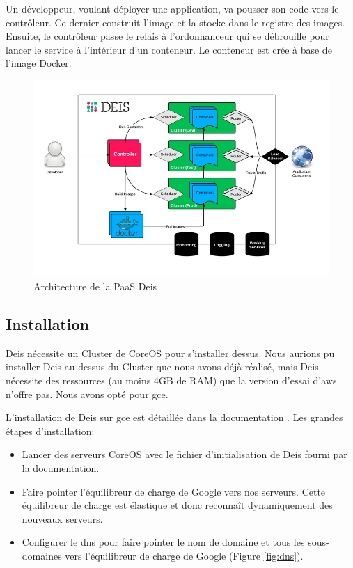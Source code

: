 \begin{onehalfspace}
Un développeur, voulant déployer une application, va pousser son code vers le contrôleur. Ce dernier construit l'image et la stocke dans le registre des images. Ensuite, le contrôleur passe le relais à l'ordonnanceur qui se débrouille pour lancer le service à l'intérieur d'un conteneur. Le conteneur est crée à base de l'image Docker.



\begin{figure}[H]
\centering
\includegraphics [scale=0.6]{chapitre5/assets/deis-architecture}
\caption{Architecture de la PaaS Deis \cite{deis-archi}}
\label{fig:deis-architecture}
\end{figure}


\subsection{Installation}


Deis nécessite un Cluster de CoreOS pour s'installer dessus. Nous aurions pu installer Deis au-dessus du Cluster que nous avons déjà réalisé, mais Deis nécessite des ressources (au moins 4GB de RAM) que la version d'essai d'\acrshort{aws} n'offre pas. Nous avons opté pour \acrshort{gce}.

L'installation de Deis sur \acrshort{gce} est détaillée dans la documentation \cite{deis-gce}. Les grandes étapes d'installation:
\begin{itemize}
	\item Lancer des serveurs CoreOS avec le fichier d'initialisation de Deis fourni par la documentation.
	\item Faire pointer l'équilibreur de charge de Google vers nos serveurs. Cette équilibreur de charge est élastique et donc reconnaît dynamiquement des nouveaux serveurs.
	\item Configurer le \acrshort{dns} pour faire pointer le nom de domaine et tous les sous-domaines vers l'équilibreur de charge de Google (Figure \ref{fig:dns}).
\end{itemize}


\end{onehalfspace}
